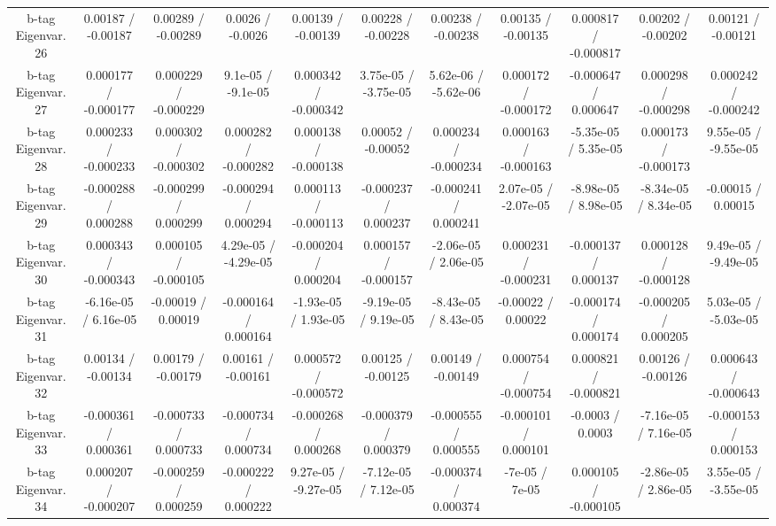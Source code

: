 \begin{table}[htbp]
\begin{center}
\begin{tabular}{|c|c|c|c|c|c|c|c|c|c|c|}
  b-tag Eigenvar. 26 & 0.00187 / -0.00187 & 0.00289 / -0.00289 & 0.0026 / -0.0026 & 0.00139 / -0.00139 & 0.00228 / -0.00228 & 0.00238 / -0.00238 & 0.00135 / -0.00135 & 0.000817 / -0.000817 & 0.00202 / -0.00202 & 0.00121 / -0.00121 \\ 
  b-tag Eigenvar. 27 & 0.000177 / -0.000177 & 0.000229 / -0.000229 & 9.1e-05 / -9.1e-05 & 0.000342 / -0.000342 & 3.75e-05 / -3.75e-05 & 5.62e-06 / -5.62e-06 & 0.000172 / -0.000172 & -0.000647 / 0.000647 & 0.000298 / -0.000298 & 0.000242 / -0.000242 \\ 
  b-tag Eigenvar. 28 & 0.000233 / -0.000233 & 0.000302 / -0.000302 & 0.000282 / -0.000282 & 0.000138 / -0.000138 & 0.00052 / -0.00052 & 0.000234 / -0.000234 & 0.000163 / -0.000163 & -5.35e-05 / 5.35e-05 & 0.000173 / -0.000173 & 9.55e-05 / -9.55e-05 \\ 
  b-tag Eigenvar. 29 & -0.000288 / 0.000288 & -0.000299 / 0.000299 & -0.000294 / 0.000294 & 0.000113 / -0.000113 & -0.000237 / 0.000237 & -0.000241 / 0.000241 & 2.07e-05 / -2.07e-05 & -8.98e-05 / 8.98e-05 & -8.34e-05 / 8.34e-05 & -0.00015 / 0.00015 \\ 
  b-tag Eigenvar. 30 & 0.000343 / -0.000343 & 0.000105 / -0.000105 & 4.29e-05 / -4.29e-05 & -0.000204 / 0.000204 & 0.000157 / -0.000157 & -2.06e-05 / 2.06e-05 & 0.000231 / -0.000231 & -0.000137 / 0.000137 & 0.000128 / -0.000128 & 9.49e-05 / -9.49e-05 \\ 
  b-tag Eigenvar. 31 & -6.16e-05 / 6.16e-05 & -0.00019 / 0.00019 & -0.000164 / 0.000164 & -1.93e-05 / 1.93e-05 & -9.19e-05 / 9.19e-05 & -8.43e-05 / 8.43e-05 & -0.00022 / 0.00022 & -0.000174 / 0.000174 & -0.000205 / 0.000205 & 5.03e-05 / -5.03e-05 \\ 
  b-tag Eigenvar. 32 & 0.00134 / -0.00134 & 0.00179 / -0.00179 & 0.00161 / -0.00161 & 0.000572 / -0.000572 & 0.00125 / -0.00125 & 0.00149 / -0.00149 & 0.000754 / -0.000754 & 0.000821 / -0.000821 & 0.00126 / -0.00126 & 0.000643 / -0.000643 \\ 
  b-tag Eigenvar. 33 & -0.000361 / 0.000361 & -0.000733 / 0.000733 & -0.000734 / 0.000734 & -0.000268 / 0.000268 & -0.000379 / 0.000379 & -0.000555 / 0.000555 & -0.000101 / 0.000101 & -0.0003 / 0.0003 & -7.16e-05 / 7.16e-05 & -0.000153 / 0.000153 \\ 
  b-tag Eigenvar. 34 & 0.000207 / -0.000207 & -0.000259 / 0.000259 & -0.000222 / 0.000222 & 9.27e-05 / -9.27e-05 & -7.12e-05 / 7.12e-05 & -0.000374 / 0.000374 & -7e-05 / 7e-05 & 0.000105 / -0.000105 & -2.86e-05 / 2.86e-05 & 3.55e-05 / -3.55e-05 \\ 

\end{tabular}
\end{center}
\end{table}
